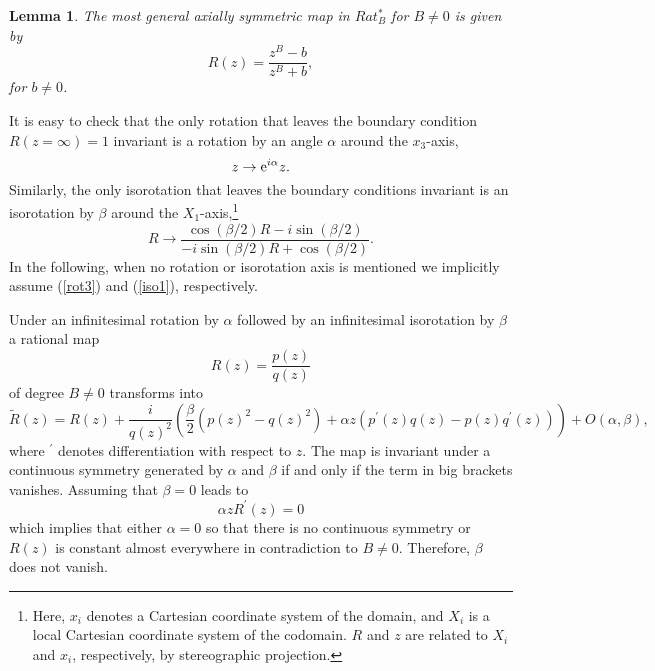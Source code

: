 \documentclass[a4paper,12pt]{article}
\newtheorem {lemma}[theorem]{Lemma}
\begin{document}
\begin{lemma}
\label{l:axial}
The most general axially symmetric map in $Rat_B^*$ for $B \neq 0$ is 
given by
\begin{equation}
\label{R_axial}
R(z) = \frac{z^B-b}{z^B+b},
\end{equation}
%
for $b \neq 0$.
\end{lemma} 

It is easy to check that the only rotation that leaves the boundary condition 
$R(z=\infty) =1$ invariant is a rotation by an angle $\alpha$ around the 
$x_3$-axis,
%
\begin{equation}
\label{rot3}
z \to {\rm e}^{i \alpha} z.
\end{equation}
%
Similarly, the only isorotation that leaves the boundary conditions 
invariant is an isorotation by $\beta$ around the 
$X_1$-axis,\footnote{Here, $x_i$ denotes a Cartesian coordinate system of 
the domain, and $X_i$ is a local Cartesian coordinate system of the 
codomain. 
$R$ and $z$ are related to $X_i$ and $x_i$, respectively, by stereographic 
projection.} 
%
\begin{equation}
\label{iso1}
R \to \frac{\cos(\beta/2) R - i \sin(\beta/2)}
{-i \sin(\beta/2) R + \cos(\beta/2)}.  
\end{equation}
%
In the following, when no rotation or isorotation axis is mentioned we 
implicitly assume (\ref{rot3}) and (\ref{iso1}), respectively.

Under an infinitesimal rotation by  $\alpha$ followed by an infinitesimal 
isorotation by $\beta$ a rational map 
%
\begin{equation}
R(z) = \frac{p(z)}{q(z)}
\end{equation}
%
of degree $B \neq 0$ transforms into
%
\begin{equation}
\label{infsym}
{\tilde R}(z) = R(z) + \frac{i}{q(z)^2} \left(\frac{\beta}{2} \left(p(z)^2 
- q(z)^2 \right) + \alpha z \left(p^\prime(z) q(z) - p(z) q^\prime(z)
\right)
\right) + 
O(\alpha, \beta),
\end{equation}
%
where ${}^\prime$ denotes differentiation with respect to $z$. The map is 
invariant under a continuous symmetry generated by $\alpha$ and $\beta$ if and 
only if the term in big brackets vanishes. Assuming that $\beta = 0$ leads 
to
%
\begin{equation}
\alpha z R^\prime(z) = 0
\end{equation}
%
which implies that either $\alpha = 0$ so that there is no continuous symmetry 
or $R(z)$ is constant almost everywhere in contradiction to $B \neq 0$. 
Therefore, $\beta$ does not vanish.
\end{document}
